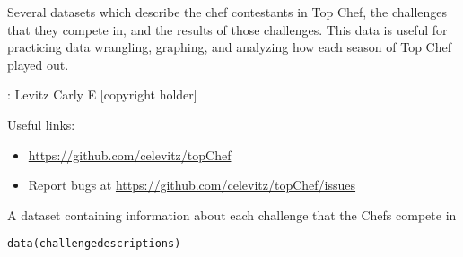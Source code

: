 \documentclass[a4paper]{book}
\begin{document}
%
\begin{Description}
Several datasets which describe the chef contestants in Top Chef, the challenges that they compete in, and the results of those challenges. This data is useful for practicing data wrangling, graphing, and analyzing how each season of Top Chef played out.
\end{Description}
%
\begin{Author}
: Levitz Carly E  [copyright holder]

\end{Author}
%
\begin{SeeAlso}
Useful links:
\begin{itemize}

\item{} \url{https://github.com/celevitz/topChef}
\item{} Report bugs at \url{https://github.com/celevitz/topChef/issues}

\end{itemize}


\end{SeeAlso}
%
\begin{Description}
A dataset containing information about each challenge that the
Chefs compete in
\end{Description}
%
\begin{Usage}
\begin{verbatim}
data(challengedescriptions)
\end{verbatim}
\end{Usage}
%
\end{document}
